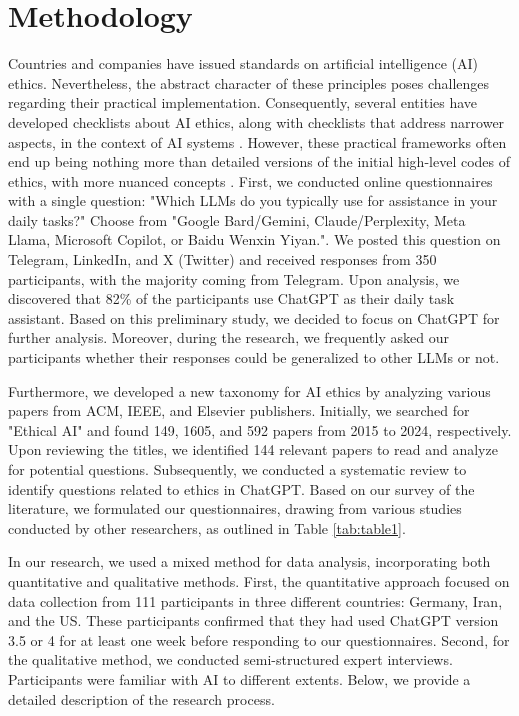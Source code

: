 \documentclass[sigconf]{acmart}
\begin{document}
\section{Methodology}

Countries and companies have issued standards on artificial intelligence (AI) ethics. Nevertheless, the abstract character of these principles poses challenges regarding their practical implementation. Consequently, several entities have developed checklists about AI ethics, along with checklists that address narrower aspects, in the context of AI systems \cite{madaio2020co, mhlanga2023open, akbar2023ethical, mhlanga2023open}. However, these practical frameworks often end up being nothing more than detailed versions of the initial high-level codes of ethics, with more nuanced concepts \cite{Hagendorff2022virtue}. First, we conducted online questionnaires with a single question: "Which LLMs do you typically use for assistance in your daily tasks?" Choose from "Google Bard/Gemini, Claude/Perplexity, Meta Llama, Microsoft Copilot, or Baidu Wenxin Yiyan.". We posted this question on Telegram, LinkedIn, and X (Twitter) and received responses from 350 participants, with the majority coming from Telegram. Upon analysis, we discovered that 82\% of the participants use ChatGPT as their daily task assistant. Based on this preliminary study, we decided to focus on ChatGPT for further analysis. Moreover, during the research, we frequently asked our participants whether their responses could be generalized to other LLMs or not.

Furthermore, we developed a new taxonomy for AI ethics by analyzing various papers from ACM, IEEE, and Elsevier publishers. Initially, we searched for "Ethical AI" and found 149, 1605, and 592 papers from 2015 to 2024, respectively. Upon reviewing the titles, we identified 144 relevant papers to read and analyze for potential questions. Subsequently, we conducted a systematic review to identify questions related to ethics in ChatGPT. Based on our survey of the literature, we formulated our questionnaires, drawing from various studies conducted by other researchers, as outlined in Table \ref{tab:table1}. 

In our research, we used a mixed method for data analysis, incorporating both quantitative and qualitative methods. First, the quantitative approach focused on data collection from 111 participants in three different countries: Germany, Iran, and the US. These participants confirmed that they had used ChatGPT version 3.5 or 4 for at least one week before responding to our questionnaires. Second, for the qualitative method, we conducted semi-structured expert interviews. Participants were familiar with AI to different extents. Below, we provide a detailed description of the research process.
\end{document}
